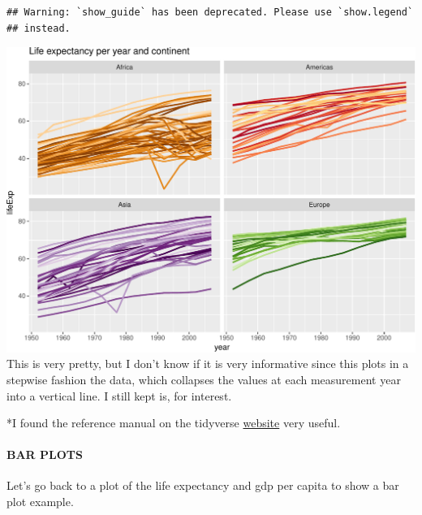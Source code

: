 \documentclass[]{article}
\newenvironment{Shaded}{\begin{snugshade}}{\end{snugshade}}
\newcommand{\KeywordTok}[1]{\textcolor[rgb]{0.13,0.29,0.53}{\textbf{{#1}}}}
\newcommand{\DataTypeTok}[1]{\textcolor[rgb]{0.13,0.29,0.53}{{#1}}}
\newcommand{\StringTok}[1]{\textcolor[rgb]{0.31,0.60,0.02}{{#1}}}
\newcommand{\OtherTok}[1]{\textcolor[rgb]{0.56,0.35,0.01}{{#1}}}
\newcommand{\NormalTok}[1]{{#1}}
\let\oldparagraph\paragraph
\renewcommand{\paragraph}[1]{\oldparagraph{#1}\mbox{}}
\begin{document}
\begin{verbatim}
## Warning: `show_guide` has been deprecated. Please use `show.legend`
## instead.
\end{verbatim}

\includegraphics{gapminder-exploration-phase2_files/figure-latex/unnamed-chunk-17-1.pdf}
This is very pretty, but I don't know if it is very informative since
this plots in a stepwise fashion the data, which collapses the values at
each measurement year into a vertical line. I still kept is, for
interest.

*I found the reference manual on the tidyverse
\href{http://ggplot2.tidyverse.org/reference/}{website} very useful.

\paragraph{BAR PLOTS}\label{bar-plots}

Let's go back to a plot of the life expectancy and gdp per capita to
show a bar plot example.

\begin{Shaded}
\end{Shaded}
\end{document}
